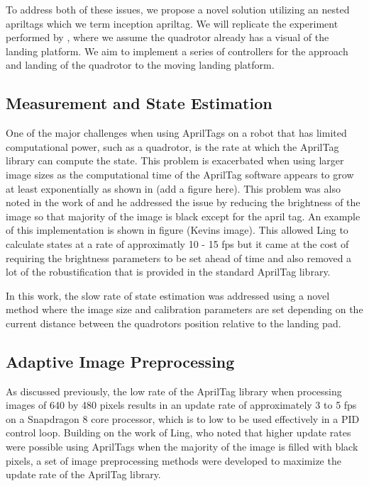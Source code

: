 \documentclass[11pt, twocolumn]{article}
\begin{document}
To address both of these issues, we propose a novel solution utilizing an nested apriltags which we term inception apriltag. We will replicate the experiment performed by \cite{Ling2014}, where we assume the quadrotor already has a visual of the landing platform. We aim to implement a series of controllers for the approach and landing of the quadrotor to the moving landing platform.

\subsection{Measurement and State Estimation}

One of the major challenges when using AprilTags on a robot that has limited computational power, such as a quadrotor, is the rate at which the AprilTag library can compute the state. This problem is exacerbated when using larger image sizes as the computational time of the AprilTag software appears to grow at least exponentially as shown in (add a figure here). This problem was also noted in the work of \cite{Ling2014} and he addressed the issue by reducing the brightness of the image so that majority of the image is black except for the april tag. An example of this implementation is shown in figure (Kevins image). This allowed Ling \cite{Lee2012} to calculate states at a rate of approximatly 10 - 15 fps but it came at the cost of requiring the brightness parameters to be set ahead of time and also removed a lot of the robustification that is provided in the standard AprilTag library.

In this work, the slow rate of state estimation was addressed using a novel method where the image size and calibration parameters are set depending on the current distance between the quadrotors position relative to the landing pad. 

\subsection{Adaptive Image Preprocessing}

As discussed previously, the low rate of the AprilTag library when processing images of 640 by 480 pixels results in an update rate of approximately 3 to 5 fps on a Snapdragon 8 core processor, which is to low to be used effectively in a PID control loop. Building on the work of Ling, who noted that higher update rates were possible using AprilTags when the majority of the image is filled with black pixels, a set of image preprocessing methods were developed to maximize the update rate of the AprilTag library. 
\end{document}
